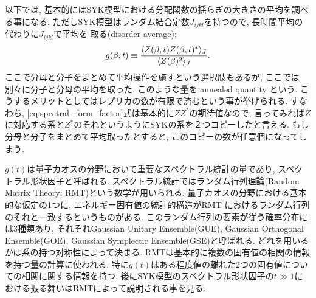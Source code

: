 以下では, 基本的にはSYK模型における分配関数の揺らぎの大きさの平均を調べる事になる. 
ただしSYK模型はランダム結合定数$J_{ijkl}$を持つので, 長時間平均の代わりに$J_{ijkl}$で平均を
取る(disorder average):
\begin{align}
	g(\beta, t) \equiv
	\frac{\langle Z(\beta, t)Z(\beta, t)^* \rangle_J}{\langle Z(\beta)^2 \rangle_J}.
	\label{eq:spectral_form_factor}
\end{align}
ここで分母と分子をまとめて平均操作を施すという選択肢もあるが, ここでは別々に分子と分母の平均を取った. 
このような量を annealed quantity という. 
こうするメリットとしてはレプリカの数が有限で済むという事が挙げられる. 
すなわち, \eqref{eq:spectral_form_factor}式は基本的に$ZZ^*$の期待値なので, 
言ってみれば$Z$に対応する系と$Z^*$のそれというようにSYKの系を２つコピーしたと言える. 
もし分母と分子をまとめて平均取ったとすると, このコピーの数が任意個になってしまう. 

$g(t)$は量子カオスの分野において重要なスペクトラル統計の量であり, 
スペクトラル形状因子と呼ばれる. 
スペクトラル統計ではランダム行列理論(Random Matrix Theory: RMT)という数学が用いられる. 
量子カオスの分野における基本的な仮定の1つに, エネルギー固有値の統計的構造がRMT
におけるランダム行列のそれと一致するというものがある. 
このランダム行列の要素が従う確率分布には3種類あり, それぞれGaussian Unitary Ensemble(GUE),
Gaussian Orthogonal Ensemble(GOE), Gaussian Symplectic Ensemble(GSE)と呼ばれる. 
どれを用いるかは系の持つ対称性によって決まる. 
RMTは基本的に複数の固有値の相関の情報を持つ量の計算に使われる. 
特に$g(t)$はある程度値の離れた2つの固有値についての相関に関する情報を持つ. 
後にSYK模型のスペクトラル形状因子の$t \gg 1$における振る舞いはRMTによって説明される事を見る. 

